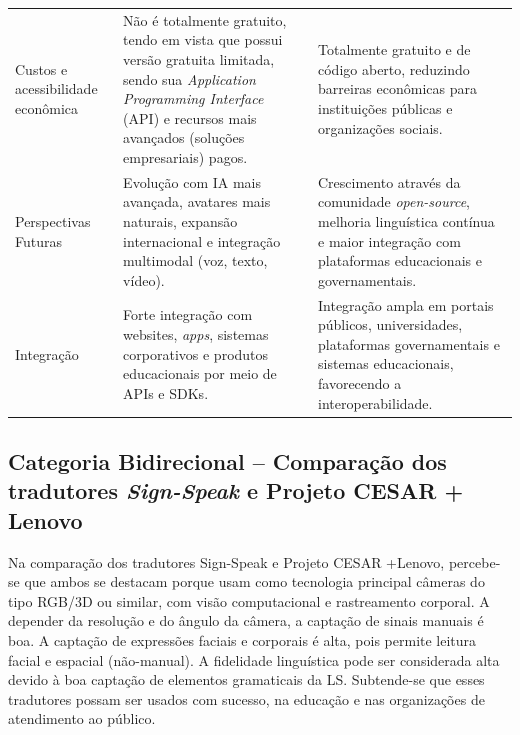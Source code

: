\documentclass[portuguese]{textolivre}
\begin{document}
\begin{table}[htbp]
\begin{threeparttable}
\begin{tabularx}{\textwidth}{@{}>{\raggedright\arraybackslash}p{2.8cm}
>{\raggedright\arraybackslash}X
>{\raggedright\arraybackslash}X@{}}
\addlinespace

Custos e acessibilidade econômica &
Não é totalmente gratuito, tendo em vista que possui versão gratuita limitada, sendo sua \textit{Application Programming Interface} (API) e recursos mais avançados (soluções empresariais) pagos. &
Totalmente gratuito e de código aberto, reduzindo barreiras econômicas para instituições públicas e organizações sociais. \\

\addlinespace

Perspectivas Futuras &
Evolução com IA mais avançada, avatares mais naturais, expansão internacional e integração multimodal (voz, texto, vídeo). &
Crescimento através da comunidade \textit{open-source}, melhoria linguística contínua e maior integração com plataformas educacionais e governamentais. \\

\addlinespace

Integração &
Forte integração com websites, \textit{apps}, sistemas corporativos e produtos educacionais por meio de APIs e SDKs. &
Integração ampla em portais públicos, universidades, plataformas governamentais e sistemas educacionais, favorecendo a interoperabilidade. \\

\bottomrule

\end{tabularx}
\end{threeparttable}
\end{table}

\subsection{Categoria Bidirecional – Comparação dos tradutores \textit{Sign-Speak} e Projeto CESAR + Lenovo}
Na comparação dos tradutores Sign-Speak e Projeto CESAR +Lenovo, percebe-se que ambos se destacam porque usam como tecnologia principal câmeras do tipo RGB/3D ou similar, com visão computacional e rastreamento corporal. A depender da resolução e do ângulo da câmera, a captação de sinais manuais é boa. A captação de expressões faciais e corporais é alta, pois permite leitura facial e espacial (não-manual). A fidelidade linguística pode ser considerada alta devido à boa captação de elementos gramaticais da LS. Subtende-se que esses tradutores possam ser usados com sucesso, na educação e nas organizações de atendimento ao público.
\end{document}
